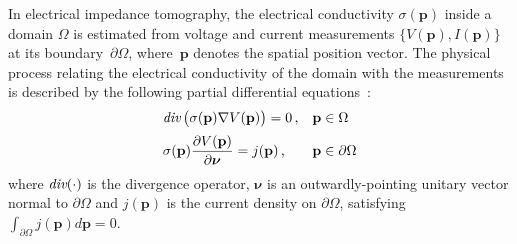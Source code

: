 \documentclass[10pt]{IEEEtran}
\newcommand{\vp}{\mathbf{\textstyle{p}}}
\begin{document}
In electrical impedance tomography, the electrical conductivity $\sigma(\vp)$ inside a domain $\Omega$ is estimated from voltage and current measurements $\{V(\vp),I(\vp)\}$ at its boundary~$\partial\Omega$, where~$\vp$ denotes the spatial position vector.
%
The physical process relating the electrical conductivity of the domain with the measurements is described by the following partial differential equations~\cite{Holder04}:
%
\begin{align} \label{eq:eit_model_1}
    \begin{array}{ll}
        \emph{div} \,\big(\sigma(\vp)\nabla V(\vp)\big) = 0 \,\text{,}
        & \vp\in\Omega \\[0.2cm]
        \displaystyle{\sigma(\vp) \frac{\partial V(\vp)}{\partial\boldsymbol{\nu}} = j(\vp)} \,\text{,}
        & \vp\in\partial\Omega
    \end{array}
\end{align}
where $\emph{div}(\cdot)$ is the divergence operator, $\boldsymbol{\nu}$ is an outwardly-pointing unitary vector normal to $\partial\Omega$ and $j(\vp)$ is the current density on $\partial\Omega$, satisfying~$\int_{\partial\Omega}j(\vp)d\vp=0$.
\end{document}

